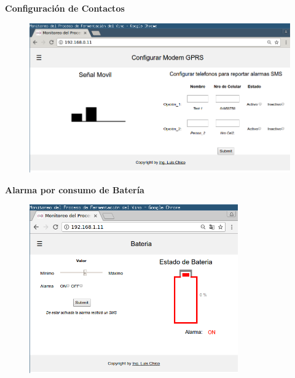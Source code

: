 \documentclass[11pt]{beamer}
\begin{document}
\begin{frame}{\textbf{\LARGE{Configuración de Contactos}}}
  \vspace{-.7cm}
  \begin{figure}[H]
    {\includegraphics[width=1\textwidth]{./imagenes/config_Modem.png}}
  \end{figure}	
\end{frame}

\begin{frame}{\textbf{\LARGE{Alarma por consumo de Batería}}}
  \vspace{-.7cm}
  \begin{figure}[H]
    {\includegraphics[width=0.8\textwidth]{./imagenes/config_bat.png}}
  \end{figure}	
\end{frame}
\end{document}
